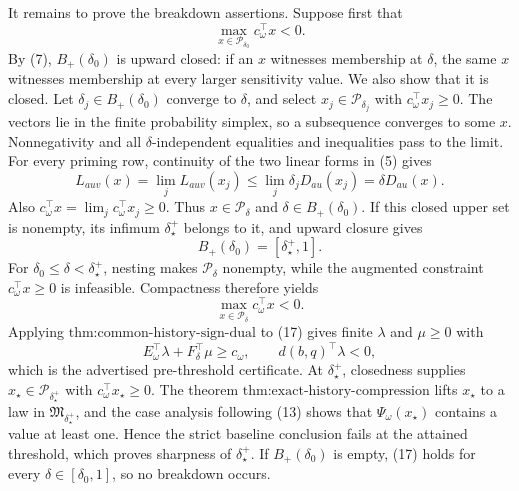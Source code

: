 It remains to prove the breakdown assertions.  Suppose first that
\[
 \max_{x\in\mathcal P_{\delta_0}}c_\omega^{\top}x<0.
\tag{14}
\]
By (7), \(B_+(\delta_0)\) is upward closed: if an \(x\) witnesses membership at \(\delta\), the same \(x\) witnesses membership at every larger sensitivity value.  We also show that it is closed.  Let \(\delta_j\in B_+(\delta_0)\) converge to \(\delta\), and select \(x_j\in\mathcal P_{\delta_j}\) with \(c_\omega^{\top}x_j\geq0\).  The vectors lie in the finite probability simplex, so a subsequence converges to some \(x\).  Nonnegativity and all \(\delta\)-independent equalities and inequalities pass to the limit.  For every priming row, continuity of the two linear forms in (5) gives
\[
 L_{auv}(x)
 =\lim_jL_{auv}(x_j)
 \leq\lim_j\delta_jD_{au}(x_j)
 =\delta D_{au}(x).
\tag{15}
\]
Also \(c_\omega^{\top}x=\lim_jc_\omega^{\top}x_j\geq0\).  Thus \(x\in\mathcal P_\delta\) and \(\delta\in B_+(\delta_0)\).  If this closed upper set is nonempty, its infimum \(\delta_\star^+\) belongs to it, and upward closure gives
\[
 B_+(\delta_0)=[\delta_\star^+,1].
\tag{16}
\]
For \(\delta_0\leq\delta<\delta_\star^+\), nesting makes \(\mathcal P_\delta\) nonempty, while the augmented constraint \(c_\omega^{\top}x\geq0\) is infeasible.  Compactness therefore yields
\[
 \max_{x\in\mathcal P_\delta}c_\omega^{\top}x<0.
\tag{17}
\]
Applying \(\text{thm:common-history-sign-dual}\) to (17) gives finite \(\lambda\) and \(\mu\geq0\) with
\[
 E_\omega^{\top}\lambda+F_\delta^{\top}\mu\geq c_\omega,
 \qquad d(b,q)^{\top}\lambda<0,
\tag{18}
\]
which is the advertised pre-threshold certificate.  At \(\delta_\star^+\), closedness supplies \(x_\star\in\mathcal P_{\delta_\star^+}\) with \(c_\omega^{\top}x_\star\geq0\).  The theorem \(\text{thm:exact-history-compression}\) lifts \(x_\star\) to a law in \(\mathfrak M_{\delta_\star^+}\), and the case analysis following (13) shows that \(\Psi_\omega(x_\star)\) contains a value at least one.  Hence the strict baseline conclusion fails at the attained threshold, which proves sharpness of \(\delta_\star^+\).  If \(B_+(\delta_0)\) is empty, (17) holds for every \(\delta\in[\delta_0,1]\), so no breakdown occurs.


